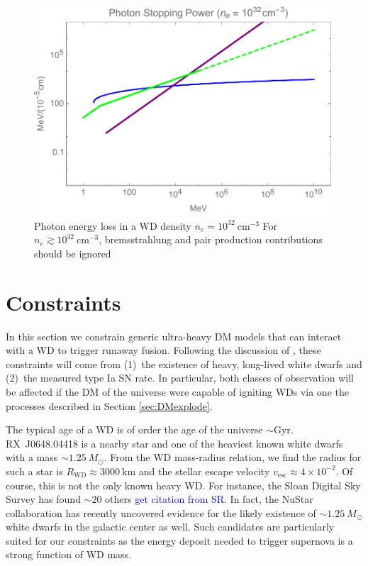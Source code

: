 \documentclass[twocolumn,showpacs,preprintnumbers,amsmath,amssymb,prd]{revtex4}
\begin{document}
\begin{figure}
\includegraphics[scale=.45]{SPphoton.pdf}
\caption{Photon energy loss in a WD density $n_e = 10^{32} ~\text{cm}^{-3}$ For $n_e \gtrsim 10^{32} ~\text{cm}^{-3}$, bremsstrahlung and pair production contributions should be ignored}
\label{fig:SPphoton}
\end{figure}

\section{Constraints}
\label{sec:Constraints}

In this section we constrain generic ultra-heavy DM models that can interact with a WD to trigger runaway fusion.
Following the discussion of \cite{Graham:2015apa}, these constraints will come from (1)~the existence of heavy, long-lived white dwarfs and (2)~the measured type Ia SN rate.
In particular, both classes of observation will be affected if the DM of the universe were capable of igniting WDs via one the processes described in Section \ref{sec:DMexplode}.


The typical age of a WD is of order the age of the universe $\sim \text{Gyr}$.
RX~J0648.04418 is a nearby star and one of the heaviest known white dwarfs with a mass $\sim 1.25 ~M_{\odot}$.
From the WD mass-radius relation, we find the radius for such a star is $R_\text{WD} \approx 3000~\text{km}$ and the stellar escape velocity $v_\text{esc} \approx 4 \times 10^{-2}$.
Of course, this is not the only known heavy WD.
For instance, the Sloan Digital Sky Survey has found $\sim 20$ others \textcolor{blue}{get citation from SR}.
In fact, the NuStar collaboration has recently uncovered evidence for the likely existence of $\sim 1.25 ~M_{\odot}$ white dwarfs in the galactic center as well.
Such candidates are particularly suited for our constraints as the energy deposit needed to trigger supernova is a strong function of WD mass.
\end{document}

